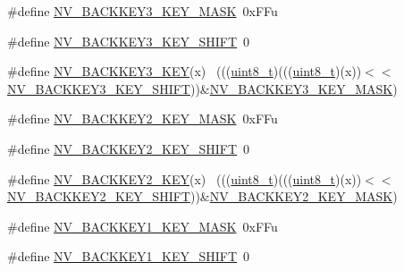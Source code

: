 \begin{DoxyCompactItemize}
\item 
\#define \hyperlink{group___n_v___register___masks_gabe9123bc8137627b30e4f75c757cfb95}{N\+V\+\_\+\+B\+A\+C\+K\+K\+E\+Y3\+\_\+\+K\+E\+Y\+\_\+\+M\+A\+SK}~0x\+F\+Fu
\item 
\#define \hyperlink{group___n_v___register___masks_ga78b75e37d984596ddd9053d2125a78ff}{N\+V\+\_\+\+B\+A\+C\+K\+K\+E\+Y3\+\_\+\+K\+E\+Y\+\_\+\+S\+H\+I\+FT}~0
\item 
\#define \hyperlink{group___n_v___register___masks_ga60012399e688ca410ed3d4c7f58d5f91}{N\+V\+\_\+\+B\+A\+C\+K\+K\+E\+Y3\+\_\+\+K\+EY}(x)                                          ~(((\hyperlink{_p_e___types_8h_aba7bc1797add20fe3efdf37ced1182c5}{uint8\+\_\+t})(((\hyperlink{_p_e___types_8h_aba7bc1797add20fe3efdf37ced1182c5}{uint8\+\_\+t})(x))$<$$<$\hyperlink{group___n_v___register___masks_ga78b75e37d984596ddd9053d2125a78ff}{N\+V\+\_\+\+B\+A\+C\+K\+K\+E\+Y3\+\_\+\+K\+E\+Y\+\_\+\+S\+H\+I\+FT}))\&\hyperlink{group___n_v___register___masks_gabe9123bc8137627b30e4f75c757cfb95}{N\+V\+\_\+\+B\+A\+C\+K\+K\+E\+Y3\+\_\+\+K\+E\+Y\+\_\+\+M\+A\+SK})
\item 
\#define \hyperlink{group___n_v___register___masks_ga5bf8822b0b59a321d9b5c30eb1618704}{N\+V\+\_\+\+B\+A\+C\+K\+K\+E\+Y2\+\_\+\+K\+E\+Y\+\_\+\+M\+A\+SK}~0x\+F\+Fu
\item 
\#define \hyperlink{group___n_v___register___masks_ga408b1083508e784cba76d5be9b147a84}{N\+V\+\_\+\+B\+A\+C\+K\+K\+E\+Y2\+\_\+\+K\+E\+Y\+\_\+\+S\+H\+I\+FT}~0
\item 
\#define \hyperlink{group___n_v___register___masks_ga5641a6e4f33b369fdcbefa85524b0610}{N\+V\+\_\+\+B\+A\+C\+K\+K\+E\+Y2\+\_\+\+K\+EY}(x)                                          ~(((\hyperlink{_p_e___types_8h_aba7bc1797add20fe3efdf37ced1182c5}{uint8\+\_\+t})(((\hyperlink{_p_e___types_8h_aba7bc1797add20fe3efdf37ced1182c5}{uint8\+\_\+t})(x))$<$$<$\hyperlink{group___n_v___register___masks_ga408b1083508e784cba76d5be9b147a84}{N\+V\+\_\+\+B\+A\+C\+K\+K\+E\+Y2\+\_\+\+K\+E\+Y\+\_\+\+S\+H\+I\+FT}))\&\hyperlink{group___n_v___register___masks_ga5bf8822b0b59a321d9b5c30eb1618704}{N\+V\+\_\+\+B\+A\+C\+K\+K\+E\+Y2\+\_\+\+K\+E\+Y\+\_\+\+M\+A\+SK})
\item 
\#define \hyperlink{group___n_v___register___masks_ga6cd05d78b113df7f3cb0d11d29931666}{N\+V\+\_\+\+B\+A\+C\+K\+K\+E\+Y1\+\_\+\+K\+E\+Y\+\_\+\+M\+A\+SK}~0x\+F\+Fu
\item 
\#define \hyperlink{group___n_v___register___masks_ga71418f17e11f902066ca404fbe473aef}{N\+V\+\_\+\+B\+A\+C\+K\+K\+E\+Y1\+\_\+\+K\+E\+Y\+\_\+\+S\+H\+I\+FT}~0

\end{DoxyCompactItemize}
